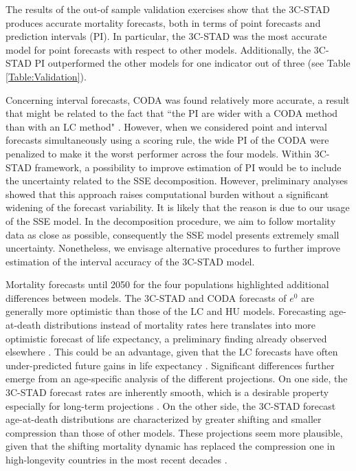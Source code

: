 \documentclass[11pt, a4paper]{article}
\begin{document}
The results of the out-of sample validation exercises show that the 3C-STAD produces accurate mortality forecasts, both in terms of point forecasts and prediction intervals (PI). In particular, the 3C-STAD was the most accurate model for point forecasts with respect to other models. Additionally, the 3C-STAD PI outperformed the other models for one indicator out of three (see Table \ref{Table:Validation}). 

Concerning interval forecasts, CODA was found relatively more accurate, a result that might be related to the fact that ``the PI are wider with a CODA method than with an LC method" \cite[][p.~546]{bergeron2017coherent}. However, when we considered point and interval forecasts simultaneously using a scoring rule, the wide PI of the CODA were penalized to make it the worst performer across the four models. Within 3C-STAD framework, a possibility to improve estimation of PI would be to include the uncertainty related to the SSE decomposition. However, preliminary analyses showed that this approach raises computational burden without a significant widening of the forecast variability. It is likely that the reason is due to our usage of the SSE model. In the decomposition procedure, we aim to follow mortality data as close as possible, consequently the SSE model presents extremely small uncertainty. Nonetheless, we envisage alternative procedures to further improve estimation of the interval accuracy of the 3C-STAD model.

Mortality forecasts until 2050 for the four populations highlighted additional differences between models. The 3C-STAD and CODA forecasts of $e^{0}$ are generally more optimistic than those of the LC and HU models. Forecasting age-at-death distributions instead of mortality rates here translates into more optimistic forecast of life expectancy, a preliminary finding already observed elsewhere \citep{bergeron2017what}. This could be an advantage, given that the LC forecasts have often under-predicted future gains in life expectancy \citep{lee2001evaluating}. Significant differences further emerge from an age-specific analysis of the different projections. On one side, the 3C-STAD forecast rates are inherently smooth, which is a desirable property especially for long-term projections \citep{li2013extending}. On the other side, the 3C-STAD forecast age-at-death distributions are characterized by greater shifting and smaller compression than those of other models. These projections seem more plausible, given that the shifting mortality dynamic has replaced the compression one in high-longevity countries in the most recent decades \citep{canudas2008modal,bergeron2015decomposing,janssen2019timing}. 
 
\end{document}
